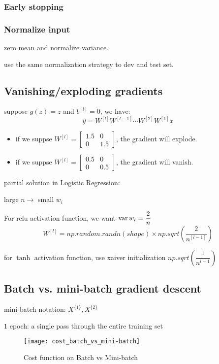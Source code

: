 \subsubsection{Early stopping}

\subsubsection{Normalize input}
zero mean and normalize variance.

use the same normalization strategy to dev and test set.

\subsection{Vanishing/exploding gradients}
suppose $g(z) = z$ and $b^{[l]} = 0$, we have:
$$\hat{y} = W^{[l]} W^{[l - 1]} \cdots W^{[2]} W^{[1]} x$$
\begin{itemize}
\item if we suppse $W^{[l]} = \begin{bmatrix}1.5 & 0 \\ 0 & 1.5\end{bmatrix}$, the gradient will explode.
\item if we suppse $W^{[l]} = \begin{bmatrix}0.5 & 0 \\ 0 & 0.5\end{bmatrix}$, the gradient will vanish.
\end{itemize}

partial solution in Logistic Regression:

large $n \longrightarrow$ small $w_i$

For relu activation function, we want $\operatorname{var}{w_i} = \dfrac{2}{n}$
$$W^{[l]} = np.random.randn(shape) \times np.sqrt(\dfrac{2}{n^{[l - 1]}})$$

for $\tanh$ activation function, use xaiver initialization $np.sqrt(\dfrac{1}{n^{l - 1}})$

\subsection{Batch vs. mini-batch gradient descent}
mini-batch notation: $X^{\{1\}}, X^{\{2\}}$

$1$ epoch: a single pass through the entire training set

\begin{figure}[htbp]
	\centering
	\texttt{[image: cost\_batch\_vs\_mini-batch]}\\
	\caption{Cost function on Batch vs Mini-batch}\label{fig.cost.batch}
\end{figure}

